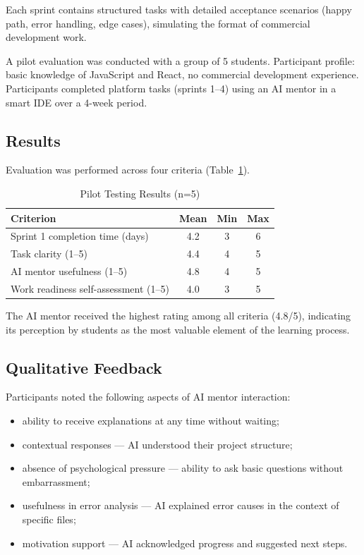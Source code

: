 \documentclass[conference,a4paper]{IEEEtran}
\begin{document}
Each sprint contains structured tasks with detailed acceptance scenarios (happy path, error handling, edge cases), simulating the format of commercial development work.

A pilot evaluation was conducted with a group of 5 students. Participant profile: basic knowledge of JavaScript and React, no commercial development experience. Participants completed platform tasks (sprints 1--4) using an AI mentor in a smart IDE over a 4-week period.

\subsection{Results}

Evaluation was performed across four criteria (Table~\ref{tab:results}).

\begin{table}[htbp]
\caption{Pilot Testing Results (n=5)}
\label{tab:results}
\centering
\begin{tabular}{|l|c|c|c|}
\hline
\textbf{Criterion} & \textbf{Mean} & \textbf{Min} & \textbf{Max} \\
\hline
Sprint 1 completion time (days) & 4.2 & 3 & 6 \\
\hline
Task clarity (1--5) & 4.4 & 4 & 5 \\
\hline
AI mentor usefulness (1--5) & 4.8 & 4 & 5 \\
\hline
Work readiness self-assessment (1--5) & 4.0 & 3 & 5 \\
\hline
\end{tabular}
\end{table}

The AI mentor received the highest rating among all criteria (4.8/5), indicating its perception by students as the most valuable element of the learning process.

\subsection{Qualitative Feedback}

Participants noted the following aspects of AI mentor interaction:
\begin{itemize}
\item ability to receive explanations at any time without waiting;
\item contextual responses --- AI understood their project structure;
\item absence of psychological pressure --- ability to ask basic questions without embarrassment;
\item usefulness in error analysis --- AI explained error causes in the context of specific files;
\item motivation support --- AI acknowledged progress and suggested next steps.
\end{itemize}
\end{document}
